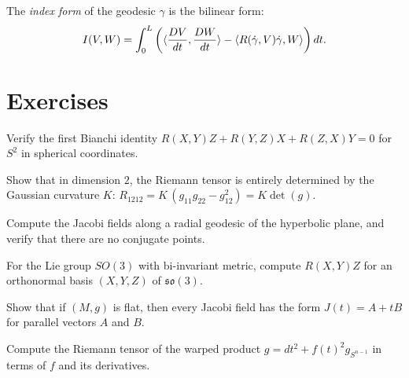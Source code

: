 \begin{definition}
The \emph{index form} of the geodesic $\gamma$ is the bilinear form:
\[
    I(V, W) = \int_0^L \left(\langle \frac{DV}{dt}, \frac{DW}{dt} \rangle
    - \langle R(\dot\gamma, V)\dot\gamma, W \rangle\right) dt.
\]
\end{definition}

\section{Exercises}

\begin{exercise}
Verify the first Bianchi identity $R(X,Y)Z + R(Y,Z)X + R(Z,X)Y = 0$ for $S^2$
in spherical coordinates.
\end{exercise}

\begin{exercise}
Show that in dimension $2$, the Riemann tensor is entirely determined by the
Gaussian curvature $K$:
$R_{1212} = K\,(g_{11}g_{22} - g_{12}^2) = K\det(g)$.
\end{exercise}

\begin{exercise}
Compute the Jacobi fields along a radial geodesic of the hyperbolic plane, and
verify that there are no conjugate points.
\end{exercise}

\begin{exercise}
For the Lie group $SO(3)$ with bi-invariant metric, compute $R(X,Y)Z$ for an
orthonormal basis $(X, Y, Z)$ of $\mathfrak{so}(3)$.
\end{exercise}

\begin{exercise}
Show that if $(M,g)$ is flat, then every Jacobi field has the form
$J(t) = A + tB$ for parallel vectors $A$ and $B$.
\end{exercise}

\begin{exercise}
Compute the Riemann tensor of the warped product $g = dt^2 + f(t)^2 g_{S^{n-1}}$
in terms of $f$ and its derivatives.
\end{exercise}

